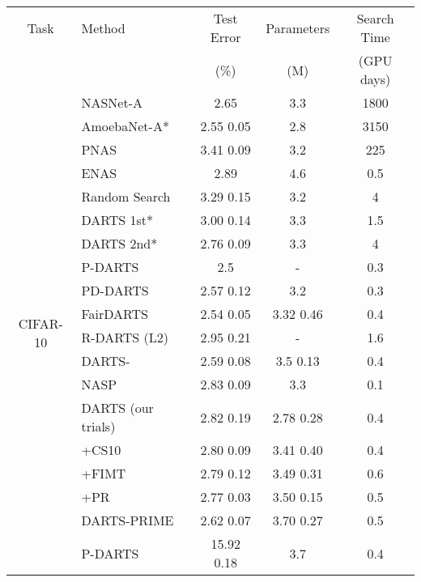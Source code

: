 \documentclass[letterpaper]{article} \usepackage{aaai22}  \usepackage{times}  \usepackage{helvet}  \usepackage{courier}  \usepackage[hyphens]{url}  \usepackage{graphicx} \urlstyle{rm} \def\UrlFont{\rm}  \usepackage{natbib}  \usepackage{caption} \DeclareCaptionStyle{ruled}{labelfont=normalfont,labelsep=colon,strut=off} \frenchspacing  \setlength{\pdfpagewidth}{8.5in}  \setlength{\pdfpageheight}{11in}  \usepackage{algorithm}
\begin{document}
\begin{table*}[t]
\centering \small
\begin{tabular}{@{}clccc@{}}
\toprule
Task & Method  &  Test Error \hspace{1mm} &  \hspace{1mm} Parameters \hspace{1mm} & \hspace{1mm} Search Time \\
 & &  (\%) \hspace{1mm} &  \hspace{1mm} (M) \hspace{1mm} & \hspace{1mm} (GPU days)
\\  \midrule
\multirow{23}{*}{CIFAR-10} & NASNet-A \cite{zoph2017neural} & 2.65 & 3.3 & 1800\\
& AmoebaNet-A*  \cite{real2019regularized} &  2.55  0.05  & 2.8 & 3150\\
& PNAS  \cite{liu2018progressive} & 3.41  0.09  & 3.2 & 225\\
& ENAS  \cite{pham2018efficient} & 2.89 & 4.6 & 0.5\\ \cmidrule{2-5} 
& Random Search \cite{liu2018darts} & 3.29  0.15  & 3.2 & 4\\
& DARTS 1st* \cite{liu2018darts} & 3.00  0.14  & 3.3 & 1.5\\
& DARTS 2nd* \cite{liu2018darts} & 2.76  0.09  & 3.3 & 4\\
& P-DARTS \cite{chen2019progressive} & 2.5 & - & 0.3\\
& PD-DARTS \cite{li2020pd} & 2.57  0.12  & 3.2 & 0.3\\
& FairDARTS \cite{chu2020fair} & 2.54  0.05 & 3.32  0.46  & 0.4\\
& R-DARTS (L2) \cite{zela2020understanding} & 2.95  0.21 & - & 1.6 \\
& DARTS- \cite{chu2020darts} & 2.59  0.08  & 3.5  0.13 & 0.4\\
& NASP \cite{yao2020efficient} & 2.83  0.09 & 3.3 & 0.1\\ \cmidrule{2-5}
& DARTS (our trials) & 2.82  0.19 & 2.78  0.28 & 0.4 \\
& +CS10 & 2.80  0.09 & 3.41  0.40 & 0.4 \\
& +FIMT & 2.79  0.12 & 3.49  0.31 & 0.6 \\
& +PR & 2.77  0.03 & 3.50  0.15 & 0.5 \\
& DARTS-PRIME & 2.62  0.07 & 3.70  0.27 & 0.5 \\
\midrule\midrule
\multirow{7}{*}{CIFAR-100} & P-DARTS \cite{chen2019progressive} & 15.92   0.18 & 3.7 & 0.4 \\

\end{tabular}
\end{table*}
\end{document}
